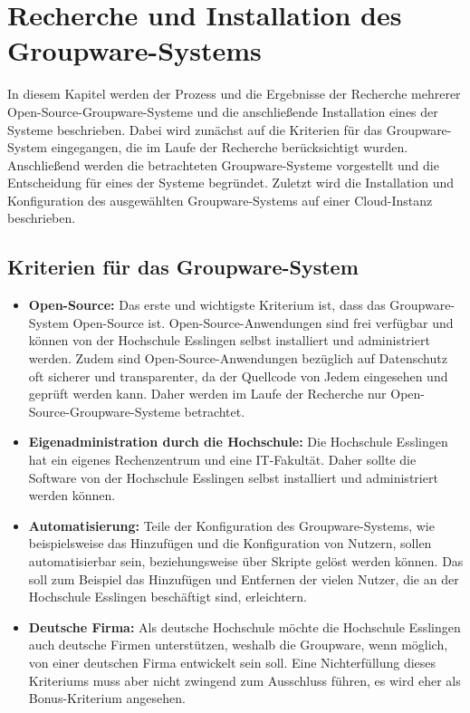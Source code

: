 
\chapter{Recherche und Installation des Groupware-Systems}

In diesem Kapitel werden der Prozess und die Ergebnisse der Recherche mehrerer Open-Source-Groupware-Systeme und die anschließende Installation eines der Systeme beschrieben.
Dabei wird zunächst auf die Kriterien für das Groupware-System eingegangen, die im Laufe der Recherche berücksichtigt wurden.
Anschließend werden die betrachteten Groupware-Systeme vorgestellt und die Entscheidung für eines der Systeme begründet.
Zuletzt wird die Installation und Konfiguration des ausgewählten Groupware-Systems auf einer Cloud-Instanz beschrieben.

\section{Kriterien für das Groupware-System}
\begin{itemize}
    \item \textbf{Open-Source:} 
    Das erste und wichtigste Kriterium ist, dass das Groupware-System Open-Source ist.
    Open-Source-Anwendungen sind frei verfügbar und können von der Hochschule Esslingen selbst installiert und administriert werden.
    Zudem sind Open-Source-Anwendungen bezüglich auf Datenschutz oft sicherer und transparenter, da der Quellcode von Jedem eingesehen und geprüft werden kann.
    Daher werden im Laufe der Recherche nur Open-Source-Groupware-Systeme betrachtet.
    \item \textbf{Eigenadministration durch die Hochschule:}
    Die Hochschule Esslingen hat ein eigenes Rechenzentrum und eine IT-Fakultät.
    Daher sollte die Software von der Hochschule Esslingen selbst installiert und administriert werden können.
    \item \textbf{Automatisierung:}
    Teile der Konfiguration des Groupware-Systems, wie beispielsweise das Hinzufügen und die Konfiguration von Nutzern, sollen automatisierbar sein, beziehungsweise über Skripte gelöst werden können.
    Das soll zum Beispiel das Hinzufügen und Entfernen der vielen Nutzer, die an der Hochschule Esslingen beschäftigt sind, erleichtern.
    \item \textbf{Deutsche Firma:}
    Als deutsche Hochschule möchte die Hochschule Esslingen auch deutsche Firmen unterstützen, weshalb die Groupware, wenn möglich, von einer deutschen Firma entwickelt sein soll.
    Eine Nichterfüllung dieses Kriteriums muss aber nicht zwingend zum Ausschluss führen, es wird eher als Bonus-Kriterium angesehen.
\end{itemize}

